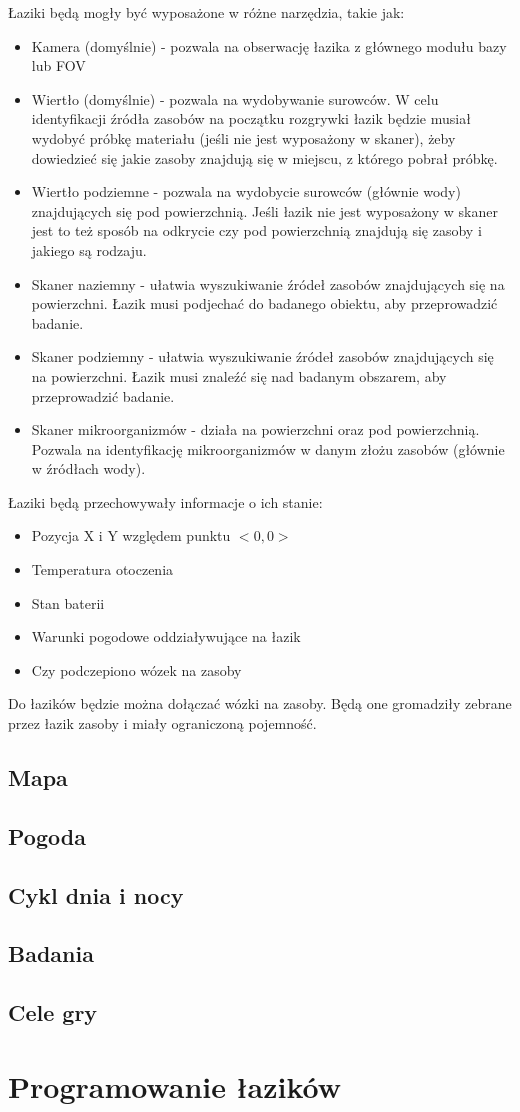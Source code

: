 \documentclass[a4paper,12pt]{article}
\begin{document}
Łaziki będą mogły być wyposażone w różne narzędzia, takie jak:
\begin{itemize}
	\item Kamera (domyślnie) - pozwala na obserwację łazika z głównego modułu bazy lub FOV
	\item Wiertło (domyślnie) - pozwala na wydobywanie surowców. W celu identyfikacji źródła zasobów na początku rozgrywki łazik będzie musiał wydobyć próbkę materiału (jeśli nie jest wyposażony w skaner), żeby dowiedzieć się jakie zasoby znajdują się w miejscu, z którego pobrał próbkę.
	\item Wiertło podziemne - pozwala na wydobycie surowców (głównie wody) znajdujących się pod powierzchnią. Jeśli łazik nie jest wyposażony w skaner jest to też sposób na odkrycie czy pod powierzchnią znajdują się zasoby i jakiego są rodzaju.
	\item Skaner naziemny - ułatwia wyszukiwanie źródeł zasobów znajdujących się na powierzchni. Łazik musi podjechać do badanego obiektu, aby przeprowadzić badanie.
	\item Skaner podziemny - ułatwia wyszukiwanie źródeł zasobów znajdujących się na powierzchni. Łazik musi znaleźć się nad badanym obszarem, aby przeprowadzić badanie.
	\item Skaner mikroorganizmów - działa na powierzchni oraz pod powierzchnią. Pozwala na identyfikację mikroorganizmów w danym złożu zasobów (głównie w źródłach wody).
\end{itemize}

Łaziki będą przechowywały informacje o ich stanie:
\begin{itemize}
	\item Pozycja X i Y względem punktu $<0,0>$
	\item Temperatura otoczenia
	\item Stan baterii
	\item Warunki pogodowe oddziaływujące na łazik
	\item Czy podczepiono wózek na zasoby
\end{itemize}

Do łazików będzie można dołączać wózki na zasoby. Będą one gromadziły zebrane przez łazik zasoby i miały ograniczoną pojemność.
\subsection{Mapa}
\subsection{Pogoda}
\subsection{Cykl dnia i nocy}
\subsection{Badania}
\subsection{Cele gry}
\section{Programowanie łazików}
\end{document}
